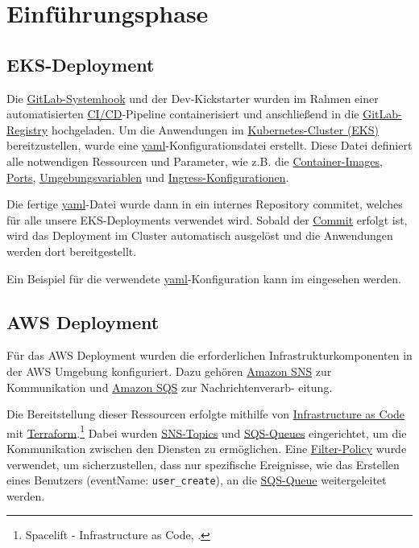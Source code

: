 \section{Einführungsphase}
\label{sec:Einfuehrungsphase}

\subsection{EKS-Deployment}
\label{sec:EKSDeployment}

Die \hyperlink{GitLabSystemhooks}{\textcolor{AOBlau}{GitLab-Systemhook}} und der Dev-Kickstarter wurden im Rahmen einer automatisierten \hyperlink{CI}{\textcolor{AOBlau}{CI/CD}}-Pipeline containerisiert und anschließend in die \hyperlink{GitLab}{\textcolor{AOBlau}{GitLab-Registry}} hochgeladen. Um die Anwendungen im \hyperlink{EKS}{\textcolor{AOBlau}{Kubernetes-Cluster (EKS)}} bereitzustellen, wurde eine \hyperlink{YAML}{\textcolor{AOBlau}{yaml}}-Konfigurationsdatei erstellt. Diese Datei definiert alle notwendigen Ressourcen und Parameter, wie z.B. die \hyperlink{ContainerImage}{\textcolor{AOBlau}{Container-Images}}, \hyperlink{Ports}{\textcolor{AOBlau}{Ports}}, \hyperlink{Umgebungsvariablen}{\textcolor{AOBlau}{Umgebungsvariablen}} und \hyperlink{KubernetesIngress}{\textcolor{AOBlau}{Ingress-Konfigurationen}}.

Die fertige \hyperlink{GitCommit}{\textcolor{AOBlau}{yaml}}-Datei wurde dann in ein internes Repository commitet, welches für alle unsere EKS-Deployments verwendet wird. Sobald der \hyperlink{GitCommit}{\textcolor{AOBlau}{Commit}} erfolgt ist, wird das Deployment im Cluster automatisch ausgelöst und die Anwendungen werden dort bereitgestellt. 

Ein Beispiel für die verwendete \hyperlink{YAML}{\textcolor{AOBlau}{yaml}}-Konfiguration kann im  eingesehen werden.

\subsection{AWS Deployment}
\label{sec:AWSDeployment}

Für das AWS Deployment wurden die erforderlichen Infrastrukturkomponenten in der AWS Umgebung konfiguriert. Dazu gehören \hyperlink{SNS}{\textcolor{AOBlau}{Amazon SNS}} zur Kommunikation und \hyperlink{SQS}{\textcolor{AOBlau}{Amazon SQS}} zur Nachrichtenverarb-
eitung. 

Die Bereitstellung dieser Ressourcen erfolgte mithilfe von \hyperlink{InfrastructureAsCode}{\textcolor{AOBlau}{Infrastructure as Code}} mit \hyperlink{Terraform}{\textcolor{AOBlau}{Terraform}}.\footnote{Spacelift - Infrastructure as Code, \cite{Iac}.} Dabei wurden \hyperlink{SNS}{\textcolor{AOBlau}{SNS-Topics}} und \hyperlink{SQS}{\textcolor{AOBlau}{SQS-Queues}} eingerichtet, um die Kommunikation zwischen den Diensten zu ermöglichen. Eine \hyperlink{FilterPolicies}{\textcolor{AOBlau}{Filter-Policy}} wurde verwendet, um sicherzustellen, dass nur spezifische Ereignisse, wie das Erstellen eines Benutzers (eventName: \texttt{user\_create}), an die \hyperlink{SQS}{\textcolor{AOBlau}{SQS-Queue}} weitergeleitet werden. 

